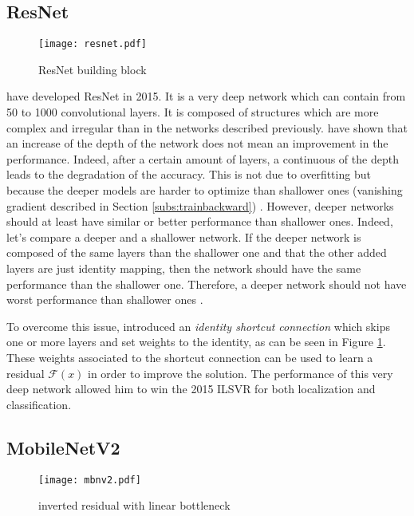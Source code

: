 \subsection{ResNet}
%
\begin{figure}
    \centering
    \texttt{[image: resnet.pdf]}
    \caption{ResNet building block \cite{he_deep_2015}}
    \label{fig:resnet}
\end{figure}
%
\textcite{he_deep_2015} have developed ResNet in 2015. It is a very deep network which can contain from 50 to 1000 convolutional layers. It is composed of structures which are more complex and irregular than in the networks described previously. \textcite{he_deep_2015} have shown that an increase of the depth of the network does not mean an improvement in the performance. Indeed, after a certain amount of layers, a continuous of the depth leads to the degradation of the accuracy. This is not due to overfitting but because the deeper models are harder to optimize than shallower ones (vanishing gradient described in Section \ref{subs:trainbackward}) \cite{matteucci_artificial_2019}. However, deeper networks should at least have similar or better performance than shallower ones. Indeed, let’s compare a deeper and a shallower network. If the deeper network is composed of the same layers than the shallower one and that the other added layers are just identity mapping, then the network should have the same performance than the shallower one. Therefore, a deeper network should not have worst performance than shallower ones \cite{matteucci_artificial_2019}.

To overcome this issue, \textcite{he_deep_2015} introduced an \textit{identity shortcut connection} which skips one or more layers and set weights to the identity, as can be seen in Figure \ref{fig:resnet}. These weights associated to the shortcut connection can be used to learn a residual $\mathcal{F}(x)$ in order to improve the solution. The performance of this very deep network allowed him to win the 2015 ILSVR for both localization and classification.
%
\subsection{MobileNetV2} \label{subs:mbv2}
%
\begin{figure}
    \centering
    \texttt{[image: mbnv2.pdf]}
    \caption{inverted residual with linear bottleneck \cite{sandler_mobilenetv2_2019}}
    \label{fig:invreslinbot}
\end{figure}

